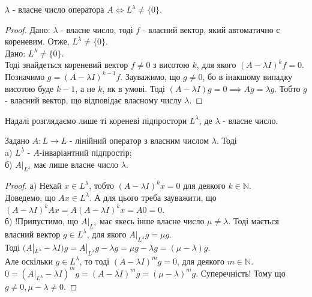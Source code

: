\documentclass{math_library}
\begin{document}
\begin{proposition}
$\lambda$ - власне число оператора $A \iff L^\lambda \neq \{0\}$.
\end{proposition}

\begin{proof}
\rightproof Дано: $\lambda$ - власне число, тоді $f$ - власний вектор, який автоматично є кореневим. Отже, $L^\lambda \neq \{0\}$.
\bigskip \\
\leftproof Дано: $L^\lambda \neq \{0\}$.\\
Тоді знайдеться кореневий вектор $f \neq 0$ з висотою $k$, для якого $(A-\lambda I)^k f = 0$.\\
Позначимо $g = (A-\lambda I)^{k-1} f$. Зауважимо, що $g \neq 0$, бо в інакшому випадку висотою буде $k-1$, а не $k$, як в умові. Тоді $(A-\lambda I) g = 0 \implies Ag = \lambda g$. Тобто $g$ - власний вектор, що відповідає власному числу $\lambda$.
\end{proof}

\begin{remark}
Надалі розглядаємо лише ті кореневі підпростори $L^\lambda$, де $\lambda$ - власне число.
\end{remark}

\begin{theorem}
Задано $A: L \to L$ - лінійний оператор з власним числом $\lambda$. Тоді\\
a) $L^\lambda$ - $A$-інваріантний підпростір;\\
б) $A|_{L^\lambda}$ має лише власне число $\lambda$.
\end{theorem}

\begin{proof}

а) Нехай $x \in L^\lambda$, тобто $(A-\lambda I)^k x = 0$ для деякого $k \in \mathbb{N}$.\\
Доведемо, що $Ax \in L^\lambda$. А для цього треба зауважити, що $(A-\lambda I)^k Ax = A(A-\lambda I)^k x = A0 = 0$.
\bigskip \\
б) !Припустимо, що $A|_{L^\lambda}$ має якесь інше власне число $\mu \neq \lambda$. Тоді мається власний вектор $g \in L^\lambda$, для якого $A|_{L^\lambda} g = \mu g$.\\
Тоді $(A|_{L^\lambda}-\lambda I)g = A|_{L^\lambda}g - \lambda g = \mu g - \lambda g = (\mu - \lambda)g$.\\
Але оскільки $g \in L^\lambda$, то тоді $(A-\lambda I)^m g = 0$, для деякого $m \in \mathbb{N}$.\\
$0 = (A|_{L^\lambda}-\lambda I)^m g = (A-\lambda I)^m g = (\mu -\lambda)^m g$. Суперечність! Тому що $g \neq 0, \mu - \lambda \neq 0$.
\end{proof}
\end{document}
